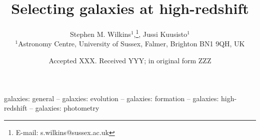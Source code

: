 \documentclass[fleqn,usenatbib]{mnras}
\title[Selecting galaxies at high-redshift]{Selecting galaxies at high-redshift}
\author[Kuusisto et al.]{Stephen M. Wilkins$^{1}$,\thanks{E-mail: s.wilkins@sussex.ac.uk},
Jussi Kuusisto$^{1}$
\\
$^{1}$Astronomy Centre, University of Sussex, Falmer, Brighton BN1 9QH, UK\\
}
\date{Accepted XXX. Received YYY; in original form ZZZ}
\newcommand{\eagle}{\mbox{\sc{Eagle}}}
\begin{document}
\label{firstpage}
\pagerange{\pageref{firstpage}--\pageref{lastpage}}
\maketitle

\begin{abstract}
\end{abstract}

\begin{keywords}
galaxies: general -- galaxies: evolution -- galaxies: formation -- galaxies: high-redshift -- galaxies: photometry
\end{keywords}






%
%
%

\end{document}

